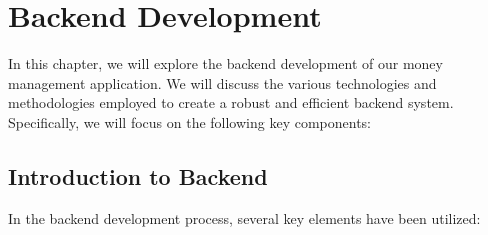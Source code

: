 \chapter{Backend Development}
\label{chap:backend}

In this chapter, we will explore the backend development of our money management application. We will discuss the various technologies and methodologies employed to create a robust and efficient backend system. Specifically, we will focus on the following key components:

\section{Introduction to Backend}
\label{sec:backend-intro}
In the backend development process, several key elements have been utilized:


